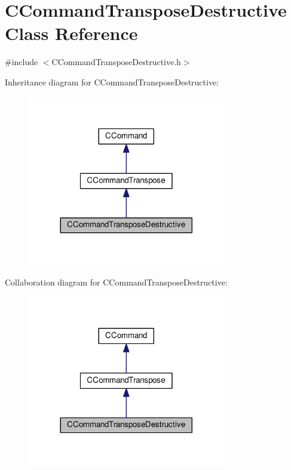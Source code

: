 \hypertarget{classCCommandTransposeDestructive}{}\section{C\+Command\+Transpose\+Destructive Class Reference}
\label{classCCommandTransposeDestructive}


{\ttfamily \#include $<$C\+Command\+Transpose\+Destructive.\+h$>$}



Inheritance diagram for C\+Command\+Transpose\+Destructive\+:\nopagebreak
\begin{figure}[H]
\begin{center}
\leavevmode
\includegraphics[width=245pt]{classCCommandTransposeDestructive__inherit__graph}
\end{center}
\end{figure}


Collaboration diagram for C\+Command\+Transpose\+Destructive\+:\nopagebreak
\begin{figure}[H]
\begin{center}
\leavevmode
\includegraphics[width=245pt]{classCCommandTransposeDestructive__coll__graph}
\end{center}
\end{figure}
